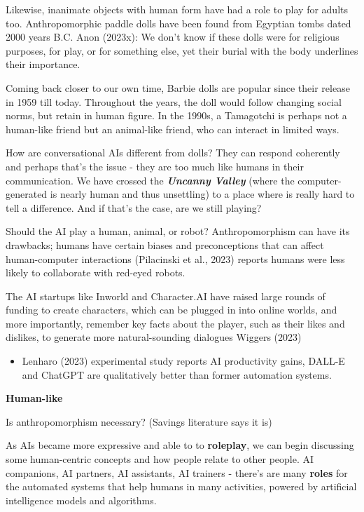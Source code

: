 \documentclass[
  letterpaper,
  DIV=11,
  numbers=noendperiod]{scrartcl}
\providecommand{\tightlist}{%
  \setlength{\itemsep}{0pt}\setlength{\parskip}{0pt}}\usepackage{longtable,booktabs,array}
\begin{document}
Likewise, inanimate objects with human form have had a role to play for
adults too. Anthropomorphic paddle dolls have been found from Egyptian
tombs dated 2000 years B.C. Anon (2023x): We don't know if these dolls
were for religious purposes, for play, or for something else, yet their
burial with the body underlines their importance.

Coming back closer to our own time, Barbie dolls are popular since their
release in 1959 till today. Throughout the years, the doll would follow
changing social norms, but retain in human figure. In the 1990s, a
Tamagotchi is perhaps not a human-like friend but an animal-like friend,
who can interact in limited ways.

How are conversational AIs different from dolls? They can respond
coherently and perhaps that's the issue - they are too much like humans
in their communication. We have crossed the \textbf{\emph{Uncanny
Valley}} (where the computer-generated is nearly human and thus
unsettling) to a place where is really hard to tell a difference. And if
that's the case, are we still playing?

Should the AI play a human, animal, or robot? Anthropomorphism can have
its drawbacks; humans have certain biases and preconceptions that can
affect human-computer interactions (Pilacinski et al., 2023) reports
humans were less likely to collaborate with red-eyed robots.

The AI startups like Inworld and Character.AI have raised large rounds
of funding to create characters, which can be plugged in into online
worlds, and more importantly, remember key facts about the player, such
as their likes and dislikes, to generate more natural-sounding dialogues
Wiggers (2023)

\begin{itemize}
\tightlist
\item
  Lenharo (2023) experimental study reports AI productivity gains,
  DALL-E and ChatGPT are qualitatively better than former automation
  systems.
\end{itemize}

\textbf{Human-like}

Is anthropomorphism necessary? (Savings literature says it is)

As AIs became more expressive and able to to \textbf{roleplay}, we can
begin discussing some human-centric concepts and how people relate to
other people. AI companions, AI partners, AI assistants, AI trainers -
there's are many \textbf{roles} for the automated systems that help
humans in many activities, powered by artificial intelligence models and
algorithms.
\end{document}
